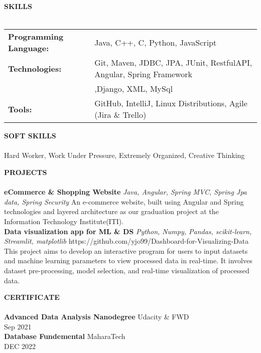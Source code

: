 \documentclass[a4paper]{article}
\newcommand{\lineunder} {
    \vspace*{-5pt} \\
    \hspace*{-18pt} \hrulefill \\
}
\newcommand{\header} [1] {
    {\hspace*{-18pt}\vspace*{6pt} \textsc{#1}}
    \vspace*{-6pt} \lineunder
}
\begin{document}
\vspace{5pt}
\header{\textbf{SKILLS}}
\vspace{5pt}
\begin{tabular}{ l l }
	\textbf{Programming Language:} & Java, C++, C, Python, JavaScript                                                         \\
	\textbf{Technologies:}         & Git, Maven, JDBC, JPA, JUnit, RestfulAPI, Angular, Spring Framework \\
                          &,Django, XML, MySql \\
	\textbf{Tools:}                & GitHub, IntelliJ, Linux Distributions, Agile (Jira \& Trello)                             \\
\end{tabular}
\vspace{10pt}

\header{\textbf{SOFT SKILLS}}
\vspace{15pt}
 Hard Worker, Work Under Pressure, Extremely Organized, Creative Thinking\\                                              
\vspace{5pt}
\vspace{5pt}

\header{\textbf{PROJECTS}}
{\textbf{eCommerce & Shopping Website}} {\sl Java, Angular, Spring MVC, Spring Jpa data, Spring Security  } \hfill 
\vspace{5pt}
An e-commerce website, built using Angular and Spring technologies and layered architecture as our graduation project at the Information Technology Institute(ITI).\\
\vspace*{2mm}
\vspace{10pt}
{\textbf{Data visualization app for ML \& DS}} {\sl Python, Numpy, Pandas, scikit-learn, Streamlit, matplotlib} \hfill 
\vspace{5pt}
https://github.com/yjo99/Dashboard-for-Visualizing-Data\\
  \vspace{5pt}
  This project aims to develop an interactive program for users to input datasets and machine learning parameters to view processed data in real-time. It involves dataset pre-processing, model selection, and real-time visualization of processed data.\\
\vspace*{2mm}

\header{\textbf{CERTIFICATE}}
\vspace{5pt}
\textbf{Advanced Data Analysis Nanodegree} \hfill Udacity \& FWD\\
\hfill Sep 2021\\
\textbf{Database Fundemental} \hfill MaharaTech \\
\hfill DEC 2022\\

\vspace*{2mm}

\ 
\end{document}
